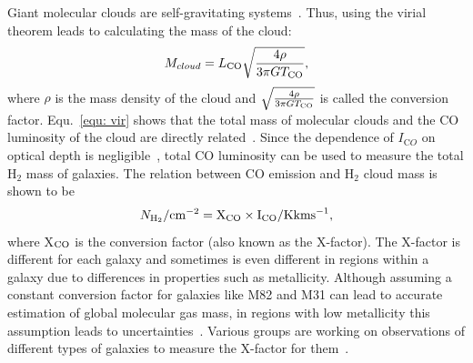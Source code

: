 Giant molecular clouds are self-gravitating systems~\citep[e.g.][]{Efstathiou83,Blitz99}.
Thus, using the virial theorem leads to calculating the mass of the cloud: 
\begin{equation}
 \label{equ: vir}
 M_{cloud} = L_{\rm CO} \sqrt{\frac{4\rho}{3\pi G T_{\rm CO}}},
\end{equation}
where $\rho$ is the mass density of the cloud and $\sqrt{\frac{4\rho}{3\pi G T_{\rm CO}}}$ is called the conversion factor.
Equ.~\ref{equ: vir} shows that the total mass of molecular clouds and the CO luminosity of the cloud are directly related~\citep{Young91}. 
Since the dependence of $I_{\mathrm CO}$ on optical depth is negligible~\citep{Krumholz09}, total CO luminosity can be used to measure the total H$_2$ mass of galaxies.
The relation between CO emission and H$_2$ cloud mass is shown to be
\begin{equation}
N_{\rm H_2}/\rm cm^{-2} = X_{\rm CO} \times I_{\rm CO}/{\rm K km s}^{-1},
\end{equation}
where X$_{\rm CO}$ is the conversion factor (also known as the X-factor).
The X-factor is different for each galaxy and sometimes is even different in regions within a galaxy due to differences in properties such as metallicity.
Although assuming a constant conversion factor for galaxies like M82 and M31 can lead to accurate estimation of global molecular gas mass, in regions with low metallicity this assumption leads to uncertainties~\citep{Bolato13}. 
Various groups are working on observations of different types of galaxies to measure the X-factor for them~\citep{Wilson95, Bosselli02, Bolato13}.

